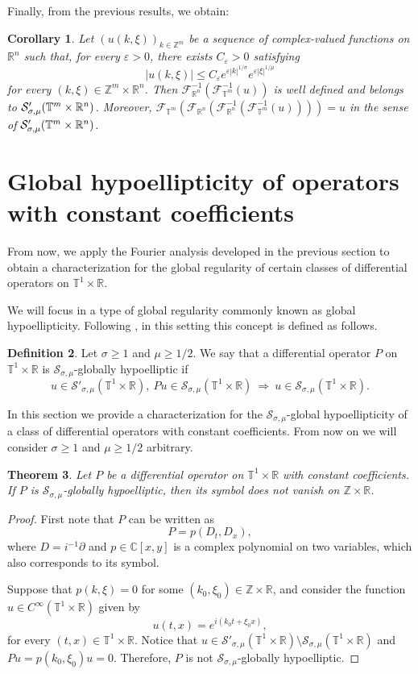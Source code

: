 \documentclass[11pt,reqno]{amsart}
\newtheorem{theorem}{Theorem}[section]
\numberwithin{equation}{section}
\newtheorem{corollary}[theorem]{Corollary}
\theoremstyle{definition}
\theoremstyle{definition}
\newtheorem{definition}[theorem]{Definition}
\newcommand{\T}{\mathbb{T}}
\newcommand{\G}{\mathnormal{\mathbb{T}^{m}\times\mathbb{R}^n}}
\newcommand{\R}{\mathbb{R}}
\newcommand{\Z}{\mathbb{Z}}
\newcommand{\s}{\mathcal{S}(\G)}
\newcommand{\g}{\mathbb{T}^1\times\mathbb{R}}
\renewcommand{\s}{\mathcal{S}_{\sigma,\mu}(\T^1\times\R)}
\renewcommand{\SS}{\mathcal{S}'_{\sigma,\mu}(\G)}
\renewcommand{\ss}{\mathcal{S}'_{\sigma,\mu}(\T^1\times\R)}
\begin{document}
    Finally, from the previous results, we obtain:

    \begin{corollary}
        Let $(u(k,\xi))_{k\in\Z^m}$ be a sequence of complex-valued functions on $\R^n$ such that, for every $\varepsilon>0$, there exists $C_\varepsilon>0$ satisfying
        \[|u(k,\xi)|\leq C_\varepsilon e^{\varepsilon|k|^{1/\sigma}}\!e^{\varepsilon|\xi|^{1/\mu}}\]
        for every $(k,\xi)\in\Z^m\times\R^n$. Then $\mathcal{F}^{-1}_{\R^n}(\mathcal{F}^{-1}_{\T^m}(u))$ is well defined and belongs to $\SS$. Moreover, $\mathcal{F}^{}_{\T^m}(\mathcal{F}^{}_{\R^n}(\mathcal{F}^{-1}_{\R^n}(\mathcal{F}^{-1}_{\T^m}(u)))) = u$ in the sense of $\SS$.
    \end{corollary}

    \section{Global hypoellipticity of operators with constant coefficients}\label{sec_gh1}

From now, we apply the Fourier analysis developed in the previous section to obtain a characterization for the global regularity of certain classes of differential operators on $\T^1\times\R$. 

We will focus in a type of global regularity commonly known as global hypoellipticity. Following \cite{AvCap2022}, in this setting this concept is  defined as follows.

\begin{definition}
    Let $\sigma\geq 1$ and $\mu\geq 1/2$. We say that a differential operator $P$ on $\T^1\times\R$ is $\mathcal{S}_{\sigma,\mu}$-globally hypoelliptic if
    \[u\in\mathcal{S}'_{\sigma,\mu}(\T^1\times\R),\ Pu\in\s\ \Rightarrow\ u\in\s.\]
\end{definition}

In this section we provide a characterization for the $\mathcal{S}_{\sigma,\mu}$-global hypoellipticity of a class of differential operators with constant coefficients.  From now on we will consider $\sigma\geq 1$ and $\mu\geq 1/2$ arbitrary.

\begin{theorem}\label{theo_gh_necessary}
Let $P$ be a differential operator on $\T^1\times\R$ with constant coefficients. If $P$ is $\mathcal{S}_{\sigma,\mu}$-globally hypoelliptic, then its symbol does not vanish on $\Z\times\R$.

\end{theorem}
\begin{proof}
First note that $P$ can be written as
\begin{equation*}
    P=p(D_t,D_x),
\end{equation*}
where $D=i^{-1}\partial$ and $p\in\mathbb{C}[x,y]$ is a complex polynomial on two variables, which also corresponds to its symbol.

Suppose that $p(k,\xi)=0$ for some $(k_0,\xi_0)\in\Z\times \R$, and consider the function $u\in C^\infty(\g)$ given by
    \[u(t,x)=e^{i(k_0t+\xi_0x)},\]
   for every $(t,x)\in\T^1\times\R$. Notice that $u\in\ss\setminus\s$ and $Pu=p(k_0,\xi_0)u=0$. Therefore, $P$ is not $\mathcal{S}_{\sigma,\mu}$-globally hypoelliptic.
\end{proof}
\end{document}

